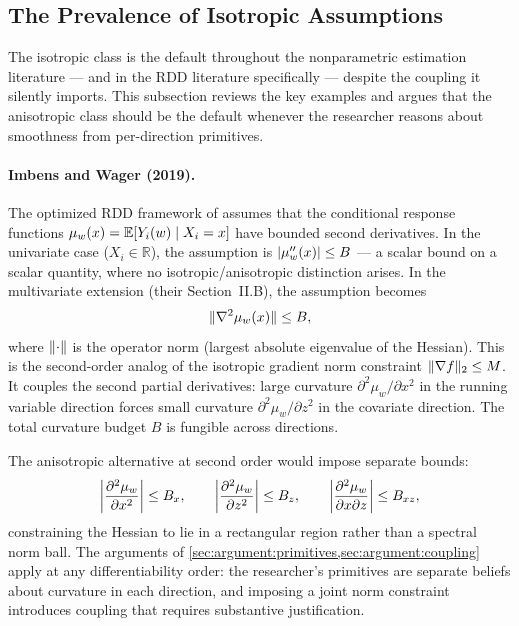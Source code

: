 \subsection{The Prevalence of Isotropic Assumptions}\label{sec:argument:prevalence}

The isotropic class is the default throughout the nonparametric estimation literature --- and in the RDD literature specifically --- despite the coupling it silently imports.
This subsection reviews the key examples and argues that the anisotropic class should be the default whenever the researcher reasons about smoothness from per-direction primitives.

\paragraph{Imbens and Wager (2019).}
The optimized RDD framework of \textcite{imbens_optimized_2019} assumes that the conditional response functions $\mu_w(x) = \E[Y_i(w) \mid X_i = x]$ have bounded second derivatives.
In the univariate case ($X_i \in \mathbb{R}$), the assumption is $\abs{\mu''_w(x)} \leq B$ --- a scalar bound on a scalar quantity, where no iso\-tropic/aniso\-tropic distinction arises.
In the multivariate extension (their Section~II.B), the assumption becomes
\begin{equation*}
	\norm{\nabla^2 \mu_w(x)} \leq B,
\end{equation*}
where $\norm{\cdot}$ is the operator norm (largest absolute eigenvalue of the Hessian).
This is the second-order analog of the isotropic gradient norm constraint $\norm{\nabla f}_2 \leq M$.
It couples the second partial derivatives: large curvature $\partial^2 \mu_w / \partial x^2$ in the running variable direction forces small curvature $\partial^2 \mu_w / \partial z^2$ in the covariate direction.
The total curvature budget $B$ is fungible across directions.

The anisotropic alternative at second order would impose separate bounds:
\begin{equation*}
	\abs*{\frac{\partial^2 \mu_w}{\partial x^2}} \leq B_x, \qquad \abs*{\frac{\partial^2 \mu_w}{\partial z^2}} \leq B_z, \qquad \abs*{\frac{\partial^2 \mu_w}{\partial x \partial z}} \leq B_{xz},
\end{equation*}
constraining the Hessian to lie in a rectangular region rather than a spectral norm ball.
The arguments of \cref{sec:argument:primitives,sec:argument:coupling} apply at any differentiability order: the researcher's primitives are separate beliefs about curvature in each direction, and imposing a joint norm constraint introduces coupling that requires substantive justification.

